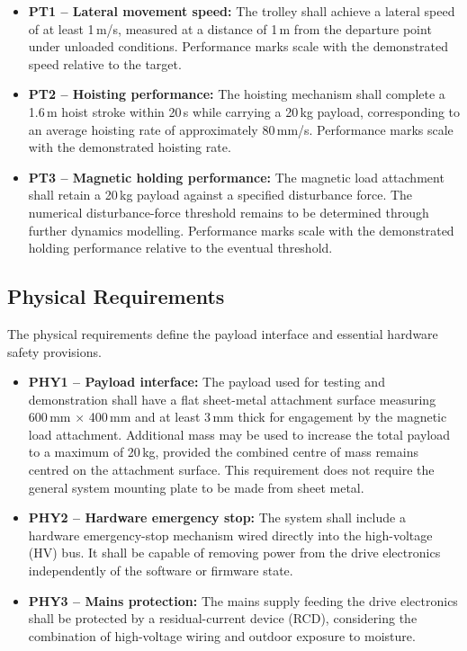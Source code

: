\begin{itemize}
    \item \textbf{PT1 -- Lateral movement speed:}
    The trolley shall achieve a lateral speed of at least
    1\,m/s, measured at a distance of 1\,m from the departure
    point under unloaded conditions. Performance marks scale
    with the demonstrated speed relative to the target.

    \item \textbf{PT2 -- Hoisting performance:}
    The hoisting mechanism shall complete a 1.6\,m hoist
    stroke within 20\,s while carrying a 20\,kg payload,
    corresponding to an average hoisting rate of approximately
    80\,mm/s. Performance marks scale with the demonstrated
    hoisting rate.

    \item \textbf{PT3 -- Magnetic holding performance:}
    The magnetic load attachment shall retain a 20\,kg payload
    against a specified disturbance force. The numerical
    disturbance-force threshold remains to be determined
    through further dynamics modelling. Performance marks
    scale with the demonstrated holding performance relative
    to the eventual threshold.
\end{itemize}


\subsection{Physical Requirements}
\label{subsec:phys-req}

The physical requirements define the payload interface and
essential hardware safety provisions.

\begin{itemize}
    \item \textbf{PHY1 -- Payload interface:}
    The payload used for testing and demonstration shall have
    a flat sheet-metal attachment surface measuring
    600\,mm $\times$ 400\,mm and at least 3\,mm thick for
    engagement by the magnetic load attachment. Additional
    mass may be used to increase the total payload to a
    maximum of 20\,kg, provided the combined centre of mass
    remains centred on the attachment surface. This
    requirement does not require the general system mounting
    plate to be made from sheet metal.

    \item \textbf{PHY2 -- Hardware emergency stop:}
    The system shall include a hardware emergency-stop
    mechanism wired directly into the high-voltage (HV) bus.
    It shall be capable of removing power from the drive
    electronics independently of the software or firmware
    state.

    \item \textbf{PHY3 -- Mains protection:}
    The mains supply feeding the drive electronics shall be
    protected by a residual-current device (RCD), considering
    the combination of high-voltage wiring and outdoor
    exposure to moisture.
\end{itemize}


